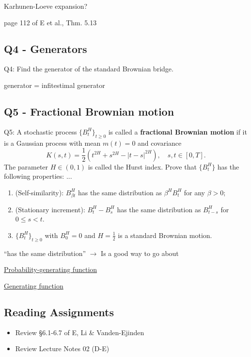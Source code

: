 \begin{quest}
	\item Karhunen-Loeve expansion?
	\begin{ans}
		page 112 of E et al., Thm. 5.13
	\end{ans}
\end{quest}

\subsection{Q4 - Generators}
Q4: Find the generator of the standard Brownian bridge. 

generator = infitestimal generator

\subsection{Q5 - Fractional Brownian motion}
Q5: A stochastic process $\{ B_t^H \}_{t\geq 0}$ is called a \textbf{fractional Brownian motion} if it is a Gaussian process with mean $m(t) = 0$ and covariance 
\[ K(s, t) = \frac{1}{2} (t^{2H} + s^{2H} - |t - s|^{2H} ), 
	\quad s, t \in [0, T].\] 
The parameter $H\in(0,1)$ is called the Hurst index. Prove that $\{B_t^H\}$ has the following properties: ... 

\begin{enumerate}
\item %
(Self-similarity): $B_{\beta t}^H$ has the same distribution as $\beta^H B_t^H$ for any $\beta > 0$;

\item %
(Stationary increment): $B_t^H - B_s^H$ has the same distribution as $B_{t-s}^H$ for $0 \leq s < t$.

\item %
$\{B_t^H\}_{t\geq 0}$ with $B_0^H = 0$ and $H = \frac{1}{2}$ is a standard Brownian motion.
\end{enumerate} %

``has the same distribution'' $\to$ Is a good way to go about 






\href{https://en.wikipedia.org/wiki/Probability-generating_function}{Probability-generating function}

\href{https://en.wikipedia.org/wiki/Generating_function}{Generating function}

\subsection{Reading Assignments}
\begin{itemize}
	\item Review \S 6.1-6.7 of E, Li \& Vanden-Ejinden
	\item Review Lecture Notes 02 (D-E)
\end{itemize}

